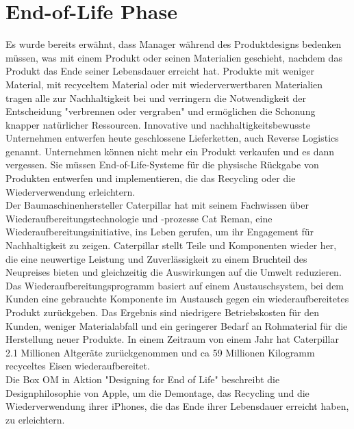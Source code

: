 \documentclass[13pt,titlepage]{article}
\begin{document}
\section*{End-of-Life Phase}

Es wurde bereits erwähnt, dass Manager während des Produktdesigns bedenken müssen, was mit einem Produkt oder seinen Materialien geschieht, nachdem das Produkt das Ende seiner Lebensdauer erreicht hat. Produkte mit weniger Material, mit recyceltem Material oder mit wiederverwertbaren Materialien tragen alle zur Nachhaltigkeit bei und verringern die Notwendigkeit der Entscheidung "verbrennen oder vergraben" und erm\"oglichen die Schonung knapper natürlicher Ressourcen. Innovative und nachhaltigkeitsbewusste Unternehmen entwerfen heute geschlossene Lieferketten, auch Reverse Logistics genannt. Unternehmen können nicht mehr ein Produkt verkaufen und es dann vergessen. Sie müssen End-of-Life-Systeme für die physische Rückgabe von Produkten entwerfen und implementieren, die das Recycling oder die Wiederverwendung erleichtern.\\
Der Baumaschinenhersteller Caterpillar hat mit seinem Fachwissen über Wiederaufbereitungstechnologie und -prozesse Cat Reman, eine Wiederaufbereitungsinitiative, ins Leben gerufen, um ihr Engagement für Nachhaltigkeit zu zeigen. Caterpillar stellt Teile und Komponenten wieder her, die eine neuwertige Leistung und Zuverlässigkeit zu einem Bruchteil des Neupreises bieten und gleichzeitig die Auswirkungen auf die Umwelt reduzieren. Das Wiederaufbereitungsprogramm basiert auf einem Austauschsystem, bei dem Kunden eine gebrauchte Komponente im Austausch gegen ein wiederaufbereitetes Produkt zurückgeben. Das Ergebnis sind niedrigere Betriebskosten für den Kunden, weniger Materialabfall und ein geringerer Bedarf an Rohmaterial für die Herstellung neuer Produkte. In einem Zeitraum von einem Jahr hat Caterpillar 2.1 Millionen Altgeräte zurückgenommen und ca 59 Millionen Kilogramm recyceltes Eisen wiederaufbereitet.\\ Die Box OM in Aktion "Designing for End of Life" beschreibt die Designphilosophie von Apple, um die Demontage, das Recycling und die Wiederverwendung ihrer iPhones, die das Ende ihrer Lebensdauer erreicht haben, zu erleichtern.\\
\end{document}

